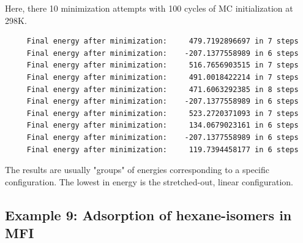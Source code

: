 Here, there 10 minimization attempts with 100 cycles of MC initialization at 298K.
\begin{tiny}
\begin{verbatim}
     Final energy after minimization:     479.7192896697 in 7 steps
     Final energy after minimization:    -207.1377558989 in 6 steps
     Final energy after minimization:     516.7656903515 in 7 steps
     Final energy after minimization:     491.0018422214 in 7 steps
     Final energy after minimization:     471.6063292385 in 8 steps
     Final energy after minimization:    -207.1377558989 in 6 steps
     Final energy after minimization:     523.2720371093 in 7 steps
     Final energy after minimization:     134.0679023161 in 6 steps
     Final energy after minimization:    -207.1377558989 in 6 steps
     Final energy after minimization:     119.7394458177 in 6 steps
\end{verbatim}
\end{tiny}
The results are usually "groups" of energies corresponding to a specific configuration.
The lowest in energy is the stretched-out, linear configuration.

\subsection*{Example 9: Adsorption of hexane-isomers in MFI}

